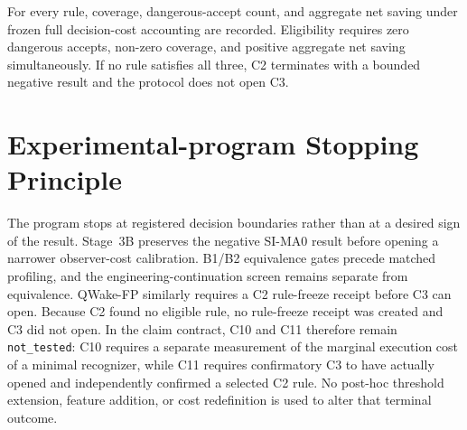 For every rule, coverage, dangerous-accept count, and aggregate net saving under frozen
full decision-cost accounting are recorded. Eligibility requires zero dangerous
accepts, non-zero coverage, and positive aggregate net saving simultaneously. If no
rule satisfies all three, C2 terminates with a bounded negative result and the protocol
does not open C3.

\section{Experimental-program Stopping Principle}
\label{sec:experiment-stopping-en}

The program stops at registered decision boundaries rather than at a desired sign of
the result. Stage~3B preserves the negative SI-MA0 result before opening a narrower
observer-cost calibration. B1/B2 equivalence gates precede matched profiling, and the
engineering-continuation screen remains separate from equivalence. QWake-FP similarly
requires a C2 rule-freeze receipt before C3 can open. Because C2 found no eligible rule,
no rule-freeze receipt was created and C3 did not open. In the claim contract, C10 and
C11 therefore remain \texttt{not\_tested}: C10 requires a separate measurement of the
marginal execution cost of a minimal recognizer, while C11 requires confirmatory C3 to
have actually opened and independently confirmed a selected C2 rule. No post-hoc
threshold extension, feature addition, or cost redefinition is used to alter that
terminal outcome.
